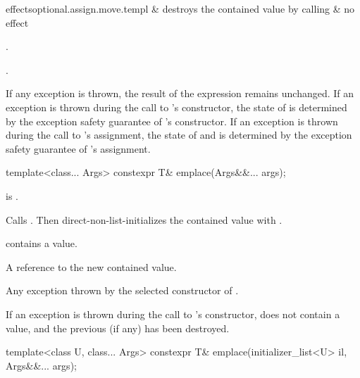 \begin{itemdescr}
\begin{lib2dtab2}{ effects}{optional.assign.move.templ}
 &
destroys the contained value by calling  &
no effect \\
\end{lib2dtab2}

\pnum
\ensures
{}.

\pnum
\returns
{}.

\pnum
\remarks
If any exception is thrown,
the result of the expression  remains unchanged.
If an exception is thrown during the call to 's constructor,
the state of  is determined by
the exception safety guarantee of 's constructor.
If an exception is thrown during the call to 's assignment,
the state of  and  is determined by
the exception safety guarantee of 's assignment.
\end{itemdescr}

%
\begin{itemdecl}
template<class... Args> constexpr T& emplace(Args&&... args);
\end{itemdecl}

\begin{itemdescr}
\pnum
\mandates
{} is .

\pnum
\effects
Calls . Then direct-non-list-initializes the contained value
with .

\pnum
\ensures
{} contains a value.

\pnum
\returns
A reference to the new contained value.

\pnum
\throws
Any exception thrown by the selected constructor of .

\pnum
\remarks
If an exception is thrown during the call to 's constructor,  does not contain a value, and the previous  (if any) has been destroyed.
\end{itemdescr}

%
\begin{itemdecl}
template<class U, class... Args> constexpr T& emplace(initializer_list<U> il, Args&&... args);
\end{itemdecl}


